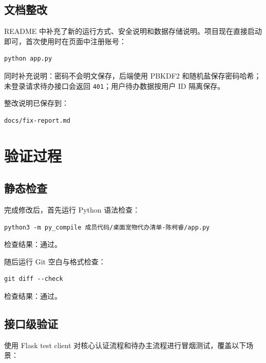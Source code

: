 \documentclass[12pt,a4paper]{ctexart}
\begin{document}
\subsection{文档整改}

README 中补充了新的运行方式、安全说明和数据存储说明。项目现在直接启动即可，首次使用时在页面中注册账号：

\begin{verbatim}
python app.py
\end{verbatim}

同时补充说明：密码不会明文保存，后端使用 PBKDF2 和随机盐保存密码哈希；未登录请求待办接口会返回 \texttt{401}；用户待办数据按用户 ID 隔离保存。

整改说明已保存到：

\begin{verbatim}
docs/fix-report.md
\end{verbatim}

\section{验证过程}

\subsection{静态检查}

完成修改后，首先运行 Python 语法检查：

\begin{verbatim}
python3 -m py_compile 成员代码/桌面宠物代办清单-陈柯睿/app.py
\end{verbatim}

检查结果：通过。

随后运行 Git 空白与格式检查：

\begin{verbatim}
git diff --check
\end{verbatim}

检查结果：通过。

\subsection{接口级验证}

使用 Flask test client 对核心认证流程和待办主流程进行冒烟测试，覆盖以下场景：
\end{document}
